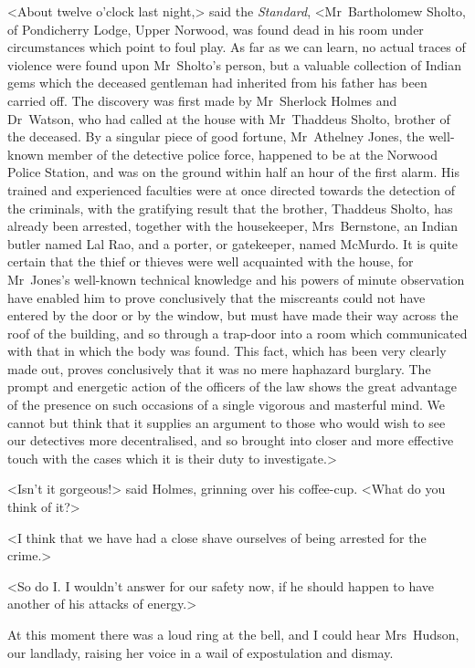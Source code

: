 <About twelve o'clock last night,> said the \textit{Standard}, <Mr~Bartholomew Sholto, of Pondicherry Lodge, Upper Norwood, was found dead in his room under circumstances which point to foul play. As far as we can learn, no actual traces of violence were found upon Mr~Sholto's person, but a valuable collection of Indian gems which the deceased gentleman had inherited from his father has been carried off. The discovery was first made by Mr~Sherlock Holmes and Dr~Watson, who had called at the house with Mr~Thaddeus Sholto, brother of the deceased. By a singular piece of good fortune, Mr~Athelney Jones, the well-known member of the detective police force, happened to be at the Norwood Police Station, and was on the ground within half an hour of the first alarm. His trained and experienced faculties were at once directed towards the detection of the criminals, with the gratifying result that the brother, Thaddeus Sholto, has already been arrested, together with the housekeeper, Mrs~Bernstone, an Indian butler named Lal Rao, and a porter, or gatekeeper, named McMurdo. It is quite certain that the thief or thieves were well acquainted with the house, for Mr~Jones's well-known technical knowledge and his powers of minute observation have enabled him to prove conclusively that the miscreants could not have entered by the door or by the window, but must have made their way across the roof of the building, and so through a trap-door into a room which communicated with that in which the body was found. This fact, which has been very clearly made out, proves conclusively that it was no mere haphazard burglary. The prompt and energetic action of the officers of the law shows the great advantage of the presence on such occasions of a single vigorous and masterful mind. We cannot but think that it supplies an argument to those who would wish to see our detectives more decentralised, and so brought into closer and more effective touch with the cases which it is their duty to investigate.>

<Isn't it gorgeous!> said Holmes, grinning over his coffee-cup. <What do you think of it?>

<I think that we have had a close shave ourselves of being arrested for the crime.>

<So do I\@. I wouldn't answer for our safety now, if he should happen to have another of his attacks of energy.>

At this moment there was a loud ring at the bell, and I could hear Mrs~Hudson, our landlady, raising her voice in a wail of expostulation and dismay.

